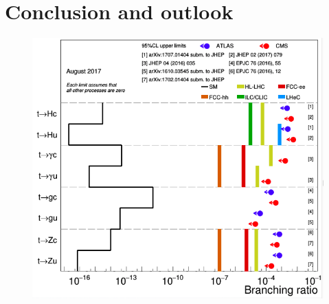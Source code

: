 \chapter{Conclusion and outlook}
\begin{figure}
	\centering
	\includegraphics[width=0.7\linewidth]{Future}
	\caption{}
	\label{fig:future}
\end{figure}



